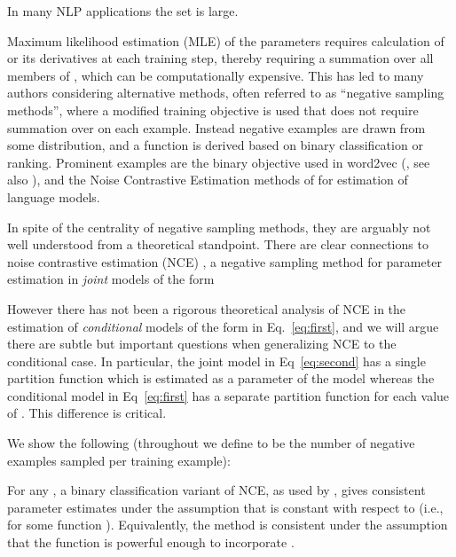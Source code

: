\documentclass[11pt,a4paper]{article}
\newcommand{\commentout}[1]{}
\begin{document}
In many NLP applications the set  is large.
\commentout{: for example in
language modeling, Word2Vec learning, or machine translation using
seq2seq models, the set  is a vocabulary that can easily
have 10s or even 100s of thousands of words.}
Maximum likelihood
estimation (MLE) of the parameters  requires calculation of
 or its derivatives at each training step, thereby
requiring a summation over all members of , which can be
computationally expensive. 
This has led to many authors considering alternative methods,
often
referred to as ``negative sampling methods'', where a
modified training objective is used that does not require summation over
 on each example. Instead negative examples are drawn
from some distribution, and a  function is derived based on binary
classification or ranking. Prominent examples are the binary objective
used in word2vec (\cite{Mikolov:2013}, see also
\cite{Levy:2014:NWE}), and the Noise Contrastive Estimation methods of
\cite{mnih2012fast,jozefowicz2016exploring} for estimation of language
models.

In spite of the centrality of negative sampling methods, they are
arguably not well understood from a theoretical standpoint. There are
clear connections to noise contrastive estimation
(NCE) \cite{gutmann2012noise}, a negative sampling method for
parameter estimation in {\em joint} models of the form

However there has not been a rigorous theoretical analysis of NCE in
the estimation of {\em conditional} models of the form in
Eq.~\ref{eq:first}, and we will argue there are subtle but important
questions when generalizing NCE to the conditional case. 
In particular, the joint model in Eq~\ref{eq:second} has a single
partition function  which is estimated as a parameter
of the model \cite{gutmann2012noise} whereas the conditional model
in Eq~\ref{eq:first} has a separate partition function 
for each value of . This difference is critical.

We show the following (throughout we define  to
be the number of negative examples sampled per
training example):





 For any , a binary classification variant of NCE, as
  used by \cite{mnih2012fast,Mikolov:2013}, gives consistent parameter estimates under the
  assumption that  is constant with respect to 
  (i.e.,  for some function
  ). Equivalently, the method is consistent under the assumption
  that the function  is powerful enough to
  incorporate .
\end{document}
